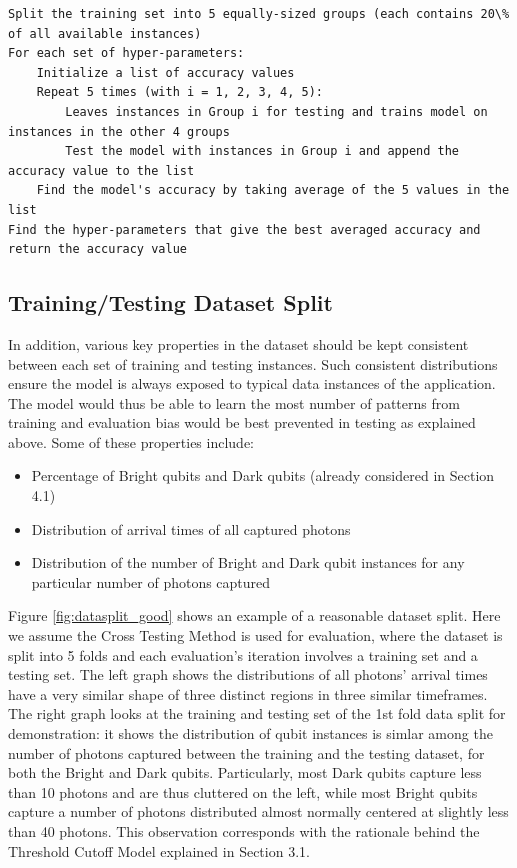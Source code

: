 \documentclass[letterpaper,twocolumn,10pt]{article}
\begin{document}
\begin{lstlisting}[basicstyle=\small]
Split the training set into 5 equally-sized groups (each contains 20\% of all available instances)
For each set of hyper-parameters:
    Initialize a list of accuracy values
    Repeat 5 times (with i = 1, 2, 3, 4, 5):
        Leaves instances in Group i for testing and trains model on instances in the other 4 groups
        Test the model with instances in Group i and append the accuracy value to the list
    Find the model's accuracy by taking average of the 5 values in the list
Find the hyper-parameters that give the best averaged accuracy and return the accuracy value
\end{lstlisting}

\subsection{Training/Testing Dataset Split}

In addition, various key properties in the dataset should be kept consistent between each set of training and testing instances. Such consistent distributions ensure the model is always exposed to typical data instances of the application. The model would thus be able to learn the most number of patterns from training and evaluation bias would be best prevented in testing as explained above. Some of these properties include:

\begin{itemize}
    \item Percentage of Bright qubits and Dark qubits (already considered in Section 4.1)
    \item Distribution of arrival times of all captured photons
    \item Distribution of the number of Bright and Dark qubit instances for any particular number of photons captured
\end{itemize}

Figure \ref{fig:datasplit_good} shows an example of a reasonable dataset split. Here we assume the Cross Testing Method is used for evaluation, where the dataset is split into 5 folds and each evaluation's iteration involves a training set and a testing set. The left graph shows the distributions of all photons' arrival times have a very similar shape of three distinct regions in three similar timeframes. The right graph looks at the training and testing set of the 1st fold data split for demonstration: it shows the distribution of qubit instances is simlar among the number of photons captured between the training and the testing dataset, for both the Bright and Dark qubits. Particularly, most Dark qubits capture less than 10 photons and are thus cluttered on the left, while most Bright qubits capture a number of photons distributed almost normally centered at slightly less than 40 photons. This observation corresponds with the rationale behind the Threshold Cutoff Model explained in Section 3.1. 
\end{document}
